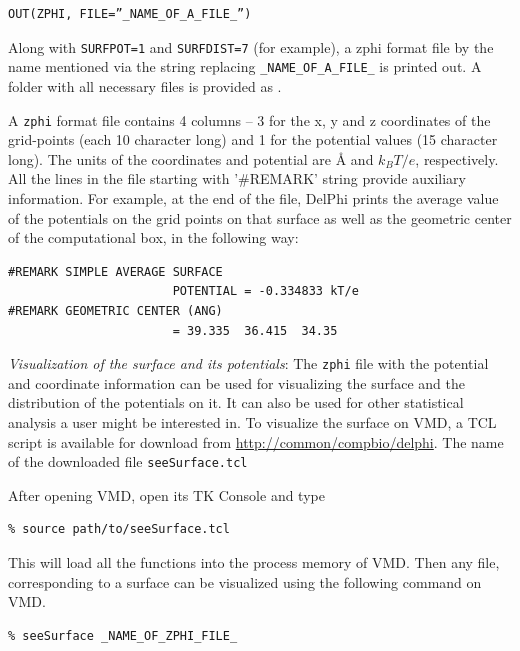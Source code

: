 \documentclass[9pt,tutorial]{livecoms}
\newcommand*\ttvar[1]{\texttt{\expandafter\dottvar\detokenize{#1}\relax}}
\newcommand*\dottvar[1]{\ifx\relax#1\else
  \expandafter\ifx\string_#1\string_\allowbreak\else#1\fi
  \expandafter\dottvar\fi}
\begin{document}
\begin{verbatim}
OUT(ZPHI, FILE=”_NAME_OF_A_FILE_”)
\end{verbatim}

Along with \texttt{SURFPOT=1} and \texttt{SURFDIST=7} (for example), a zphi format file by the name mentioned via the string replacing \texttt{\_NAME\_OF\_A\_FILE\_} is printed out. A folder with all necessary files is provided as \ttvar{Example_3.1.3/}. 

A \texttt{zphi} format file contains 4 columns – 3 for the x, y and z coordinates of the grid-points (each 10 character long) and 1 for the potential values (15 character long). The units of the coordinates and potential are Å and $ k_BT/e $, respectively. All the lines in the file starting with '\#REMARK' string provide auxiliary information. For example, at the end of the file, DelPhi prints the average value of the potentials on the grid points on that surface as well as the geometric center of the computational box, in the following way:

\begin{verbatim}
#REMARK SIMPLE AVERAGE SURFACE 
                       POTENTIAL = -0.334833 kT/e
#REMARK GEOMETRIC CENTER (ANG)          
                       = 39.335  36.415  34.35
\end{verbatim}

\textit{Visualization of the surface and its potentials}:
The \texttt{zphi} file with the potential and coordinate information can be used for visualizing the surface and the distribution of the potentials on it. It can also be used for other statistical analysis a user might be interested in. To visualize the surface on VMD\cite{humphrey1996vmd}, a TCL script is available for download from \url{http://common/compbio/delphi}. The name of the downloaded file \texttt{seeSurface.tcl}

After opening VMD, open its TK Console and type

\begin{verbatim}
% source path/to/seeSurface.tcl
\end{verbatim}

This will load all the functions into the process memory of VMD\cite{humphrey1996vmd}. Then any file, corresponding to a surface can be visualized using the following command on VMD.

\begin{verbatim}
% seeSurface _NAME_OF_ZPHI_FILE_
\end{verbatim}
\end{document}
